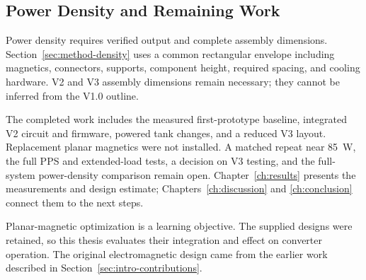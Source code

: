 \subsection{Power Density and Remaining Work}

Power density requires verified output and complete assembly dimensions. Section~\ref{sec:method-density} uses a common rectangular envelope including magnetics, connectors, supports, component height, required spacing, and cooling hardware. V2 and V3 assembly dimensions remain necessary; they cannot be inferred from the V1.0 outline.

The completed work includes the measured first-prototype baseline, integrated V2 circuit and firmware, powered tank changes, and a reduced V3 layout. Replacement planar magnetics were not installed. A matched repeat near \SI{85}{\watt}, the full PPS and extended-load tests, a decision on V3 testing, and the full-system power-density comparison remain open. Chapter~\ref{ch:results} presents the measurements and design estimate; Chapters~\ref{ch:discussion} and \ref{ch:conclusion} connect them to the next steps.

Planar-magnetic optimization is a learning objective. The supplied designs were retained, so this thesis evaluates their integration and effect on converter operation. The original electromagnetic design came from the earlier work described in Section~\ref{sec:intro-contributions}.
